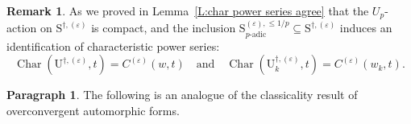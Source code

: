 \documentclass[12pt]{amsart}
\theoremstyle{definition}
\newtheorem{remark}[subsection]{Remark}
\newtheorem{para}[subsection]{Paragraph}
\numberwithin{equation}{subsection}
\def\rmU{\mathrm{U}}
\def\rmS{\mathrm{S}}
\DeclareMathOperator{\Char}{Char}
\begin{document}
\begin{remark}
\label{R:comparison of char power series for power basis and small basis}
As we proved in Lemma~\ref{L:char power series agree} that the $U_p$-action on $\rmS^{\dagger, (\varepsilon)}$ is compact, and the inclusion $\rmS_{p\textrm{-adic}}^{(\varepsilon), \leq 1/p} \subseteq \rmS^{\dagger, (\varepsilon)}$ induces an identification of  characteristic power series: 
\begin{equation}
\label{E:char Up of power is equal to char Up of small basis}\Char(\rmU^{\dagger,(\varepsilon)},t) = C^{(\varepsilon)}(w, t) \quad \textrm{and} \quad \Char(\rmU_k^{\dagger,(\varepsilon)}, t) = C^{(\varepsilon)}(w_k, t).
\end{equation}
\end{remark}

\begin{para}
\label{P:para_118}
The following is an analogue of the classicality result of overconvergent automorphic forms.
\end{para}
\end{document}
